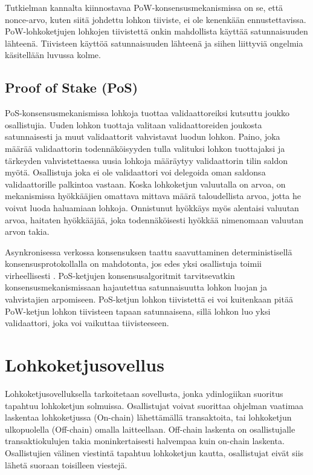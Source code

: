 Tutkielman kannalta kiinnostavaa PoW-konsensusmekanismissa on se, että nonce-arvo, kuten siitä johdettu lohkon tiiviste, ei ole kenenkään ennustettavissa. PoW-lohkoketjujen lohkojen tiivistettä onkin mahdollista käyttää satunnaisuuden lähteenä. Tiivisteen käyttöä satunnaisuuden lähteenä ja siihen liittyviä ongelmia käsitellään luvussa kolme.

\subsection{Proof of Stake (PoS)}

PoS-konsensusmekanismissa lohkoja tuottaa validaattoreiksi kutsuttu joukko osallistujia. Uuden lohkon tuottaja valitaan validaattoreiden joukosta satunnaisesti ja muut validaattorit vahvistavat luodun lohkon. Paino, joka määrää validaattorin todennäköisyyden tulla valituksi lohkon tuottajaksi ja tärkeyden vahvistettaessa uusia lohkoja määräytyy validaattorin tilin saldon myötä. Osallistuja joka ei ole validaattori voi delegoida oman saldonsa validaattorille palkintoa vastaan. Koska lohkoketjun valuutalla on arvoa, on mekanismissa hyökkääjien omattava mittava määrä taloudellista arvoa, jotta he voivat luoda haluamiaan lohkoja. Onnistunut hyökkäys myös alentaisi valuutan arvoa, haitaten hyökkääjää, joka todennäköisesti hyökkää nimenomaan valuutan arvon takia.

Asynkronisessa verkossa konsensuksen taattu saavuttaminen deterministisellä konsensusprotokollalla on mahdotonta, jos edes yksi osallistuja toimii virheellisesti \cite{fischer_impossibility_1985}. PoS-ketjujen konsensusalgoritmit tarvitsevatkin konsensusmekanismissaan hajautettua satunnaisuutta lohkon luojan ja vahvistajien arpomiseen. PoS-ketjun lohkon tiivistettä ei voi kuitenkaan pitää PoW-ketjun lohkon tiivisteen tapaan satunnaisena, sillä lohkon luo yksi validaattori, joka voi vaikuttaa tiivisteeseen.

\section{Lohkoketjusovellus}

Lohkoketjusovelluksella tarkoitetaan sovellusta, jonka ydinlogiikan suoritus tapahtuu lohkoketjun solmuissa. Osallistujat voivat suorittaa ohjelman vaatimaa laskentaa lohkoketjussa (On-chain) lähettämällä transaktoita, tai lohkoketjun ulkopuolella (Off-chain) omalla laitteellaan. Off-chain laskenta on osallistujalle transaktiokulujen takia moninkertaisesti halvempaa kuin on-chain laskenta. Osallistujien välinen viestintä tapahtuu lohkoketjun kautta, osallistujat eivät siis lähetä suoraan toisilleen viestejä.


